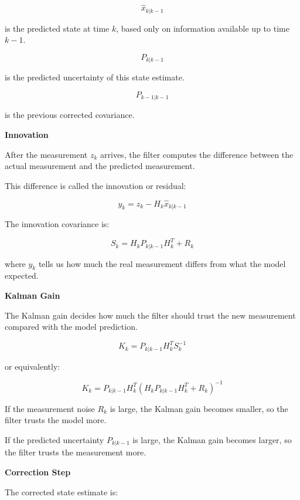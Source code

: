 \documentclass{book}
\providecommand{\ProjectDeepHeading}[2]{%
    \par\medskip\noindent\textbf{#2}\par\smallskip
}
\begin{document}
        \[
            \hat{x}_{k|k-1}
        \]
        
        is the predicted state at time \(k\), based only on information available up to time \(k-1\).
        
        \[
            P_{k|k-1}
        \]
        
        is the predicted uncertainty of this state estimate.
        
        \[
            P_{k-1|k-1}
        \]
        
        is the previous corrected covariance.
    
    
    \ProjectDeepHeading{11}{Innovation}
        
        After the measurement \(z_k\) arrives, the filter computes the difference between the actual measurement and the predicted measurement.
        
        This difference is called the innovation or residual:
        
        \[
            y_k = z_k - H_k \hat{x}_{k|k-1}
        \]
        
        The innovation covariance is:
        
        \[
            S_k = H_k P_{k|k-1} H_k^T + R_k
        \]
        
        where \(y_k\) tells us how much the real measurement differs from what the model expected.
    
    
    \ProjectDeepHeading{11}{Kalman Gain}
        
        The Kalman gain decides how much the filter should trust the new measurement compared with the model prediction.
        
        \[
            K_k = P_{k|k-1} H_k^T S_k^{-1}
        \]
        
        or equivalently:
        
        \[
            K_k = P_{k|k-1} H_k^T
            \left(
                H_k P_{k|k-1} H_k^T + R_k
            \right)^{-1}
        \]
        
        If the measurement noise \(R_k\) is large, the Kalman gain becomes smaller, so the filter trusts the model more.
        
        If the predicted uncertainty \(P_{k|k-1}\) is large, the Kalman gain becomes larger, so the filter trusts the measurement more.
    
    
    \ProjectDeepHeading{11}{Correction Step}
        
        The corrected state estimate is:
        
\end{document}
